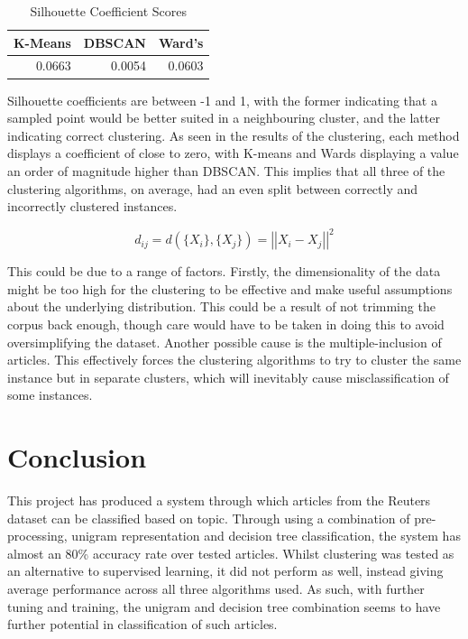 \documentclass[11pt]{article}
\begin{document}
\begin{table}[htbp]
  \centering
  \caption{Silhouette Coefficient Scores}
    \begin{tabular}{rrr}
    \toprule
    K-Means & DBSCAN & Ward's \\
    \midrule
    0.0663 & 0.0054 & 0.0603 \\
    \bottomrule
    \end{tabular}%
  \label{tab:sil}%
\end{table}%

Silhouette coefficients are between -1 and 1, with the former indicating that a sampled point would be better suited in a neighbouring cluster, and the latter indicating correct clustering. As seen in the results of the clustering, each method displays a coefficient of close to zero, with K-means and Wards displaying a value an order of magnitude higher than DBSCAN. This implies that all three of the clustering algorithms, on average, had an even split between correctly and incorrectly clustered instances. 


\begin{equation}
\label{ward-eq}
d_{ij} = d(\{X_{i}\},\{X_{j}\}) = {\left\vert\left\vert X_{i} - X_{j} \right\vert\right\vert}^{2}
\end{equation}

This could be due to a range of factors. Firstly, the dimensionality of the data might be too high for the clustering to be effective and make useful assumptions about the underlying distribution. This could be a result of not trimming the corpus back enough, though care would have to be taken in doing this to avoid oversimplifying the dataset. Another possible cause is the multiple-inclusion of articles. This effectively forces the clustering algorithms to try to cluster the same instance but in separate clusters, which will inevitably cause misclassification of some instances. 

\section{Conclusion}
This project has produced a system through which articles from the Reuters dataset can be classified based on topic. Through using a combination of pre-processing, unigram representation and decision tree classification, the system has almost an 80\% accuracy rate over tested articles. Whilst clustering was tested as an alternative to supervised learning, it did not perform as well, instead giving average performance across all three algorithms used. As such, with further tuning and training, the unigram and decision tree combination seems to have further potential in classification of such articles.



\end{document}
